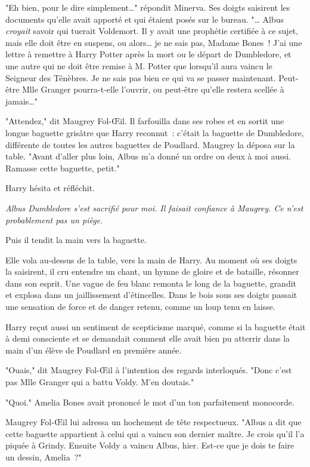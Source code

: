 "Eh bien, pour le dire simplement…" répondit Minerva. Ses doigts saisirent les documents qu'elle avait apporté et qui étaient posés sur le bureau. "… Albus \emph{croyait} savoir qui tuerait Voldemort. Il y avait une prophétie certifiée à ce sujet, mais elle doit être en suspens, ou alors… je ne sais pas, Madame Bones~! J'ai une lettre à remettre à Harry Potter après la mort ou le départ de Dumbledore, et une autre qui ne doit être remise à M. Potter que lorsqu'il aura vaincu le Seigneur des Ténèbres. Je ne sais pas bien ce qui va se passer maintenant. Peut-être Mlle Granger pourra-t-elle l'ouvrir, ou peut-être qu'elle restera scellée à jamais…"

"Attendez," dit Maugrey Fol-Œil. Il farfouilla dans ses robes et en sortit une longue baguette grisâtre que Harry reconnut~: c'était la baguette de Dumbledore, différente de toutes les autres baguettes de Poudlard. Maugrey la déposa sur la table. "Avant d'aller plus loin, Albus m'a donné un ordre ou deux à moi aussi. Ramasse cette baguette, petit."

Harry hésita et réfléchit.

\emph{Albus Dumbledore s'est sacrifié pour moi. Il faisait confiance à Maugrey. Ce n'est probablement pas un piège.}

Puis il tendit la main vers la baguette.

Elle vola au-dessus de la table, vers la main de Harry. Au moment où ses doigts la saisirent, il cru entendre un chant, un hymne de gloire et de bataille, résonner dans son esprit. Une vague de feu blanc remonta le long de la baguette, grandit et explosa dans un jaillissement d'étincelles. Dans le bois sous ses doigts passait une sensation de force et de danger retenu, comme un loup tenu en laisse.

Harry reçut aussi un sentiment de scepticisme marqué, comme si la baguette était à demi consciente et se demandait comment elle avait bien pu atterrir dans la main d'un élève de Poudlard en première année.

"Ouais," dit Maugrey Fol-Œil à l'intention des regards interloqués. "Donc c'est pas Mlle Granger qui a battu Voldy. M'en doutais."

"Quoi." Amelia Bones avait prononcé le mot d'un ton parfaitement monocorde.

Maugrey Fol-Œil lui adressa un hochement de tête respectueux. "Albus a dit que cette baguette appartient à celui qui a vaincu son dernier maître. Je crois qu'il l'a piquée à Grindy. Ensuite Voldy a vaincu Albus, hier. Est-ce que je dois te faire un dessin, Amelia~?"

